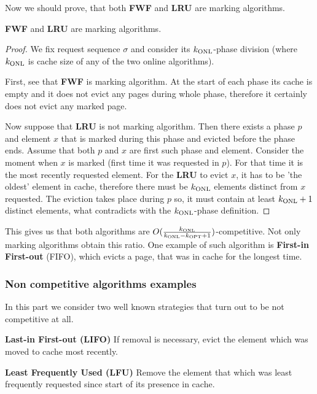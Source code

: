 Now we should prove, that both \textbf{FWF} and \textbf{LRU} are
marking algorithms.
\begin{propo}
 \textbf{FWF} and \textbf{LRU} are marking algorithms.
\end{propo}
\begin{proof}
 We fix request sequence $\sigma$ and consider its $k_{\mathrm{ONL}}$-phase division 
(where $k_{\mathrm{ONL}}$ is cache size of any of the two online algorithms).

First, see that \textbf{FWF} is marking algorithm. At the start of each phase 
its cache is empty and it does not evict any pages during whole phase, 
therefore it certainly does not evict any marked page.

Now suppose that \textbf{LRU} is not marking algorithm. Then there exists a 
phase $p$ and element $x$ that is marked during this phase and evicted before 
the phase ends. Assume that both $p$ and $x$ are first such phase and element. 
Consider the moment when $x$ is marked (first time it was requested in $p$). 
For that time it is the most recently requested element. For the \textbf{LRU} to 
evict $x$, it has to be 'the oldest' element in cache, therefore there must be 
$k_{\mathrm{ONL}}$ elements distinct from $x$ requested. The eviction takes place 
during $p$ so, it must contain 
at least $k_{\mathrm{ONL}}+1$ distinct elements, what contradicts with the $k_{\mathrm{ONL}}$-phase definition. 
\end{proof}
This gives us that both algorithms are $O(\frac{k_{\mathrm{ONL}}}{k_{\mathrm{ONL}}-k_{\mathrm{OPT}}+1})$-competitive. Not 
only marking algorithms obtain this ratio. One example of such algorithm is 
\textbf{First-in First-out} (FIFO), which evicts a page, that was in cache for 
the longest time.

\subsubsection{Non competitive algorithms examples}
In this part we consider two well known strategies that turn out to be not 
competitive at all.
\begin{myalgo}
 \textbf{Last-in First-out (LIFO)}
 \newline
If removal is necessary, evict the element which was moved to cache most 
recently.
\end{myalgo}
\begin{myalgo}
 \textbf{Least Frequently Used (LFU)}
 \newline
Remove the element that which was least frequently requested since start of its 
presence in cache.
\end{myalgo}

